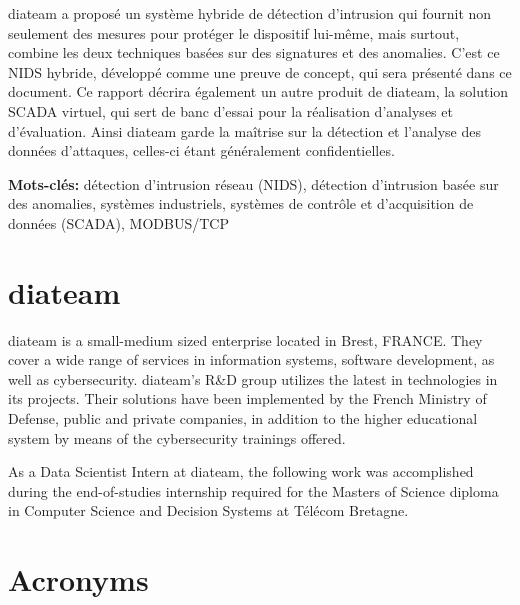 \documentclass[11pt,]{article}
\begin{document}
diateam a proposé un système hybride de détection d'intrusion qui
fournit non seulement des mesures pour protéger le dispositif lui-même,
mais surtout, combine les deux techniques basées sur des signatures et
des anomalies. C'est ce NIDS hybride, développé comme une preuve de
concept, qui sera présenté dans ce document. Ce rapport décrira
également un autre produit de diateam, la solution SCADA virtuel, qui
sert de banc d'essai pour la réalisation d'analyses et d'évaluation.
Ainsi diateam garde la maîtrise sur la détection et l'analyse des
données d'attaques, celles-ci étant généralement confidentielles.

\bigskip
\bigskip
\textbf{Mots-clés: } détection d'intrusion réseau (NIDS), détection
d'intrusion basée sur des anomalies, systèmes industriels, systèmes de
contrôle et d'acquisition de données (SCADA), MODBUS/TCP

\newpage
\mbox{} \thispagestyle{empty}

\clearpage

\section*{diateam}\label{diateam}

diateam is a small-medium sized enterprise located in Brest, FRANCE.
They cover a wide range of services in information systems, software
development, as well as cybersecurity. diateam's R\&D group utilizes the
latest in technologies in its projects. Their solutions have been
implemented by the French Ministry of Defense, public and private
companies, in addition to the higher educational system by means of the
cybersecurity trainings offered.

As a Data Scientist Intern at diateam, the following work was
accomplished during the end-of-studies internship required for the
Masters of Science diploma in Computer Science and Decision Systems at
Télécom Bretagne.

\newpage
\mbox{} \thispagestyle{empty}

\clearpage

\tableofcontents

\cleardoublepage

\listoffigures

\cleardoublepage

\listoftables

\newpage

\section*{Acronyms}\label{acronyms}
\end{document}
